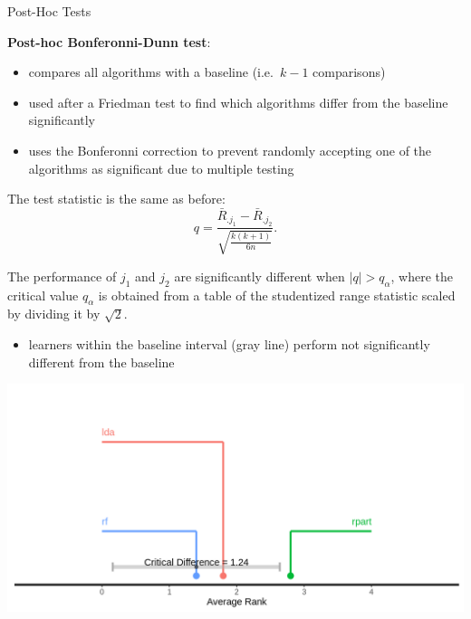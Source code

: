 \begin{frame}[c,allowframebreaks]{Post-Hoc Tests}
    \framebreak

    \textbf{Post-hoc Bonferonni-Dunn test}:

    \begin{itemize}
    \item compares all algorithms with a baseline (i.e.\ $k-1$ comparisons)
    \item used after a Friedman test to find which algorithms differ from the baseline significantly
    \item uses the Bonferonni correction to prevent randomly accepting one of the algorithms as significant due to multiple testing
    \end{itemize}
    The test statistic is the same as before:
    $$q = \frac{\bar{R}_{.j_1} - \bar{R}_{.j_2}}{\sqrt{\frac{k(k+1)}{6n}}}.$$

    The performance of $j_1$ and $j_2$ are significantly different when $|q| > q_{\alpha}$, where the critical value $q_{\alpha}$ is obtained from a table of the studentized range statistic scaled by dividing it by $\sqrt{2}$.

    \framebreak

    \begin{itemize}
        \item learners within the baseline interval (gray line) perform not
            significantly different from the baseline
    \end{itemize}
    \begin{center}
        \includegraphics[height=.6\textheight]{crit-diff-bd}
    \end{center}

    \end{frame}

